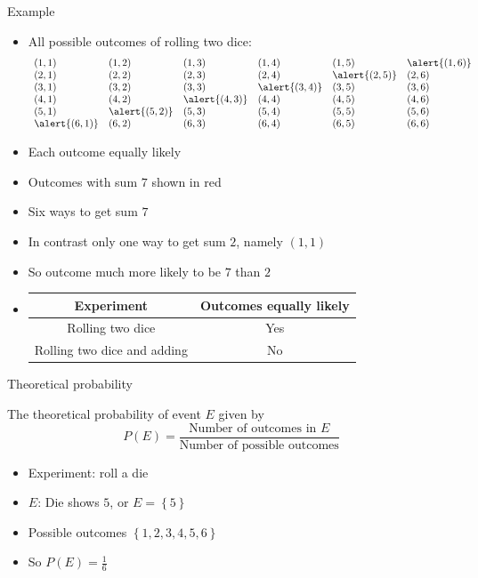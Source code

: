 \documentclass[handout]{beamer}
\theoremstyle{definition}
\begin{document}
\begin{frame}{Example}
\begin{itemize}
\item All possible outcomes of rolling two dice:
\[\begin{array}{llllll}
\left(1,1\right)&
\left(1,2\right)&
\left(1,3\right)&
\left(1,4\right)&
\left(1,5\right)&
\alert{\left(1,6\right)}\\
\left(2,1\right)&
\left(2,2\right)&
\left(2,3\right)&
\left(2,4\right)&
\alert{\left(2,5\right)}&
\left(2,6\right)\\
\left(3,1\right)&
\left(3,2\right)&
\left(3,3\right)&
\alert{\left(3,4\right)}&
\left(3,5\right)&
\left(3,6\right)\\
\left(4,1\right)&
\left(4,2\right)&
\alert{\left(4,3\right)}&
\left(4,4\right)&
\left(4,5\right)&
\left(4,6\right)\\
\left(5,1\right)&
\alert{\left(5,2\right)}&
\left(5,3\right)&
\left(5,4\right)&
\left(5,5\right)&
\left(5,6\right)\\
\alert{\left(6,1\right)}&
\left(6,2\right)&
\left(6,3\right)&
\left(6,4\right)&
\left(6,5\right)&
\left(6,6\right)
\end{array}\]
\item Each outcome equally likely
\item Outcomes with sum $7$ shown in \alert{red}
\item Six ways to get sum $7$
\item In contrast only \alert{one} way to get sum $2$, namely $\left(1,1\right)$
\item So outcome much more likely to be $7$ than $2$
\item[]
\begin{tabular}{c|c}
{\bf Experiment}&{\bf Outcomes equally likely}\\\hline
Rolling two dice&Yes\\\hline
Rolling two dice and adding&No
\end{tabular}
\end{itemize}
\end{frame}

\begin{frame}{Theoretical probability}
\begin{definition} The \alert{theoretical probability}
of event $E$ given by
\[P\left(E\right)
=\frac{\text{Number of outcomes in $E$}}{\text{Number of possible outcomes}}\]
\end{definition}
\begin{example}
\begin{itemize}
\item Experiment: roll a die
\item $E$: Die shows $5$, or $E=\left\{5\right\}$
\item Possible outcomes $\left\{1,2,3,4,5,6\right\}$
\item So $P\left(E\right)=\frac{1}{6}$
\end{itemize}
\end{example}
\end{frame}
\end{document}
